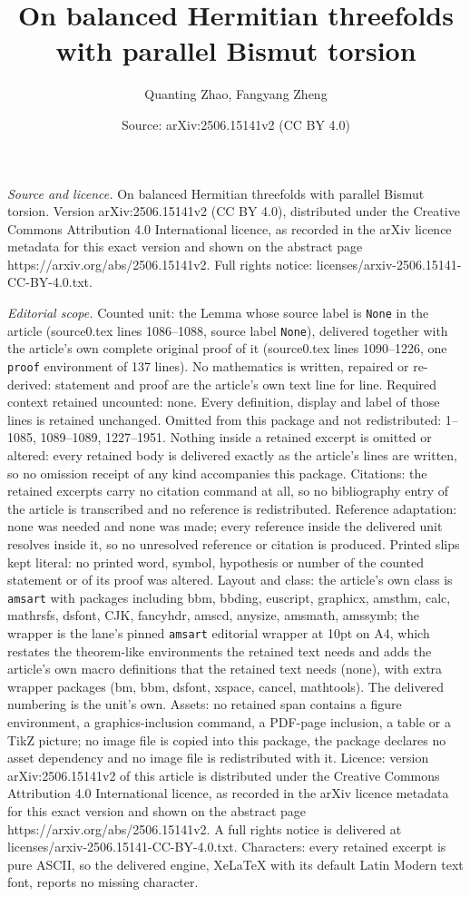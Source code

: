 \documentclass[10pt,a4paper]{amsart}
\title[On balanced Hermitian threefolds with parallel Bismut torsio]{On balanced Hermitian threefolds with parallel Bismut torsion}
\author{Quanting Zhao, Fangyang Zheng}
\date{Source: arXiv:2506.15141v2 (CC BY 4.0)}
\begin{document}
\maketitle

\noindent\emph{Source and licence.} On balanced Hermitian threefolds with parallel Bismut torsion. Version arXiv:2506.15141v2 (CC BY 4.0), distributed under the Creative Commons Attribution 4.0 International licence, as recorded in the arXiv licence metadata for this exact version and shown on the abstract page https://arxiv.org/abs/2506.15141v2. Full rights notice: licenses/arxiv-2506.15141-CC-BY-4.0.txt.\par\smallskip

\noindent\textit{Editorial scope.} Counted unit: the Lemma whose source label is \texttt{None} in the article (source0.tex lines 1086--1088, source label \texttt{None}), delivered together with the article's own complete original proof of it (source0.tex lines 1090--1226, one \texttt{proof} environment of 137 lines). No mathematics is written, repaired or re-derived: statement and proof are the article's own text line for line. Required context retained uncounted: none. Every definition, display and label of those lines is retained unchanged. Omitted from this package and not redistributed: 1--1085, 1089--1089, 1227--1951. Nothing inside a retained excerpt is omitted or altered: every retained body is delivered exactly as the article's lines are written, so no omission receipt of any kind accompanies this package. Citations: the retained excerpts carry no citation command at all, so no bibliography entry of the article is transcribed and no reference is redistributed. Reference adaptation: none was needed and none was made; every reference inside the delivered unit resolves inside it, so no unresolved reference or citation is produced. Printed slips kept literal: no printed word, symbol, hypothesis or number of the counted statement or of its proof was altered. Layout and class: the article's own class is \texttt{amsart} with packages including bbm, bbding, euscript, graphicx, amsthm, calc, mathrsfs, dsfont, CJK, fancyhdr, amscd, anysize, amsmath, amssymb; the wrapper is the lane's pinned \texttt{amsart} editorial wrapper at 10pt on A4, which restates the theorem-like environments the retained text needs and adds the article's own macro definitions that the retained text needs (none), with extra wrapper packages (bm, bbm, dsfont, xspace, cancel, mathtools). The delivered numbering is the unit's own. Assets: no retained span contains a figure environment, a graphics-inclusion command, a PDF-page inclusion, a table or a TikZ picture; no image file is copied into this package, the package declares no asset dependency and no image file is redistributed with it. Licence: version arXiv:2506.15141v2 of this article is distributed under the Creative Commons Attribution 4.0 International licence, as recorded in the arXiv licence metadata for this exact version and shown on the abstract page https://arxiv.org/abs/2506.15141v2. A full rights notice is delivered at licenses/arxiv-2506.15141-CC-BY-4.0.txt. Characters: every retained excerpt is pure ASCII, so the delivered engine, XeLaTeX with its default Latin Modern text font, reports no missing character.
\end{document}
